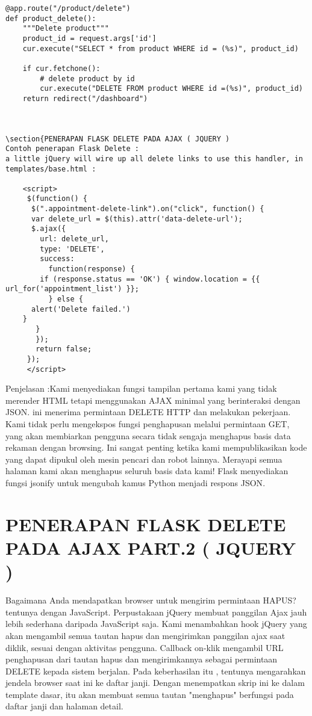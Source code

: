 \begin{verbatim}
@app.route("/product/delete")
def product_delete():
    """Delete product"""
    product_id = request.args['id']
    cur.execute("SELECT * from product WHERE id = (%s)", product_id)

    if cur.fetchone():
        # delete product by id
        cur.execute("DELETE FROM product WHERE id =(%s)", product_id)
    return redirect("/dashboard")



\section{PENERAPAN FLASK DELETE PADA AJAX ( JQUERY )
Contoh penerapan Flask Delete :
a little jQuery will wire up all delete links to use this handler, in templates/base.html :

	<script>
	 $(function() {
	  $(".appointment-delete-link").on("click", function() {
	  var delete_url = $(this).attr('data-delete-url');
	  $.ajax({
	    url: delete_url,
	    type: 'DELETE',
	    success:
          function(response) {
		if (response.status == 'OK') { window.location = {{ url_for('appointment_list') }};
          } else {
	  alert('Delete failed.')
	}
       }
       });
       return false;
     });
     </script>
\end{verbatim}
Penjelasan :Kami menyediakan fungsi tampilan pertama kami yang tidak merender HTML tetapi menggunakan AJAX minimal yang berinteraksi dengan JSON.
ini menerima permintaan DELETE HTTP dan melakukan pekerjaan. Kami tidak perlu mengekspos fungsi penghapusan melalui permintaan GET, yang akan membiarkan pengguna secara tidak sengaja menghapus basis data
rekaman dengan browsing. Ini sangat penting ketika kami mempublikasikan kode yang dapat dipukul oleh mesin pencari dan robot lainnya. Merayapi semua halaman kami akan menghapus seluruh basis data kami!
Flask menyediakan fungsi jsonify untuk mengubah kamus Python menjadi respons JSON\cite{duplain2013instant}.


\section{PENERAPAN FLASK DELETE PADA AJAX PART.2 ( JQUERY )}
Bagaimana Anda mendapatkan browser untuk mengirim permintaan HAPUS? tentunya dengan JavaScript. Perpustakaan jQuery membuat panggilan Ajax jauh lebih sederhana daripada JavaScript saja.  
Kami menambahkan hook jQuery yang akan mengambil semua tautan hapus dan mengirimkan panggilan ajax saat diklik, sesuai dengan aktivitas pengguna. Callback on-klik mengambil URL penghapusan 
dari tautan hapus dan mengirimkannya sebagai permintaan DELETE kepada sistem berjalan. Pada keberhasilan itu , tentunya mengarahkan jendela browser saat ini ke daftar janji. Dengan menempatkan
 skrip ini ke dalam template dasar, itu akan membuat semua tautan "menghapus" berfungsi pada daftar janji dan halaman detail\cite{duplain2013instant}.





